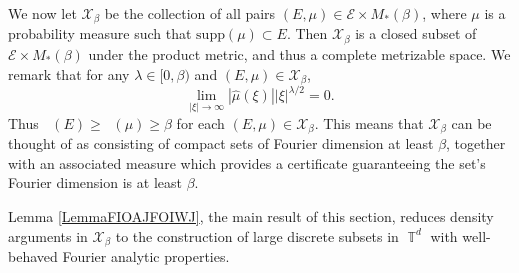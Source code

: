 \documentclass[dvipsnames,letterpaper,12pt]{article}
\numberwithin{equation}{section}
\DeclareMathOperator{\fordim}{\dim_{\mathbb{F}}}
\DeclareMathOperator{\TT}{\mathbb{T}}
\newtheorem{theorem}{Theorem}
\numberwithin{theorem}{section}
\begin{document}
We now let $\mathcal{X}_\beta$ be the collection of all pairs $(E,\mu) \in \mathcal{E} \times M_*(\beta)$, where $\mu$ is a probability measure such that $\text{supp}(\mu) \subset E$. Then $\mathcal{X}_\beta$ is a closed subset of $\mathcal{E} \times M_*(\beta)$ under the product metric, and thus a complete metrizable space. We remark that for any $\lambda \in [0,\beta)$ and $(E,\mu) \in \mathcal{X}_\beta$,
%
\begin{equation} \label{equationGFSCSC4}
    \lim_{|\xi| \to \infty} |\widehat{\mu}(\xi)| |\xi|^{\lambda/2} = 0.
\end{equation}
%
Thus $\fordim(E) \geq \fordim(\mu) \geq \beta$ for each $(E,\mu) \in \mathcal{X}_\beta$. This means that $\mathcal{X}_\beta$ can be thought of as consisting of compact sets of Fourier dimension at least $\beta$, together with an associated measure which provides a certificate guaranteeing the set's Fourier dimension is at least $\beta$.

\begin{comment}
\begin{theorem}
    $\mathcal{X}$ is a closed subset of $\mathcal{E} \times M(\beta)$.
\end{theorem}
\begin{proof}
    Suppose $\{ (E_k,\mu_k) \}$ is a sequence of elements of $\mathcal{X}$ converging to some tuple $(E,\mu) \in \mathcal{E} \times M(\beta)$. Fix $\varepsilon > 0$. Since $E_k \to E$ in the Hausdorff dimension, there exists $k_0$ such that for $k \geq k_0$, $E_k \subset E(\varepsilon)$. Since $\mu_k \to \mu$ weakly, this implies that $\mu$ is a probability measure, and that $\text{supp}(\mu) \subset E(\varepsilon)$. Taking $\varepsilon \to 0$ shows that $\text{supp}(\mu) \subset E$. Again for a fixed $\varepsilon > 0$, applying the triangle inequality and the reverse triangle inequality combined with \eqref{equationGFSCSC4} applied to $\mu_k$, we conclude
    \[ \lim_{|\xi| \to \infty} |\xi|^{\beta/2 - \varepsilon} |\widehat{\mu}(\xi)| = \lim_{|\xi| \to \infty} |\xi|^{\beta/2 - \varepsilon} |\widehat{\mu}(\xi) - \widehat{\mu_k}(\xi)| \leq \| \mu - \mu_k \|_{M(\beta,\varepsilon)}. \]
    Taking $k \to \infty$ shows that
    \[ \lim_{|\xi| \to \infty} |\xi|^{\beta/2 - \varepsilon} |\widehat{\mu}(\xi)| = 0, \]
    which completes the proof.
\end{proof}
\end{comment}

Lemma \ref{LemmaFIOAJFOIWJ}, the main result of this section, reduces density arguments in $\mathcal{X}_\beta$ to the construction of large discrete subsets in $\TT^d$ with well-behaved Fourier analytic properties.
\end{document}
